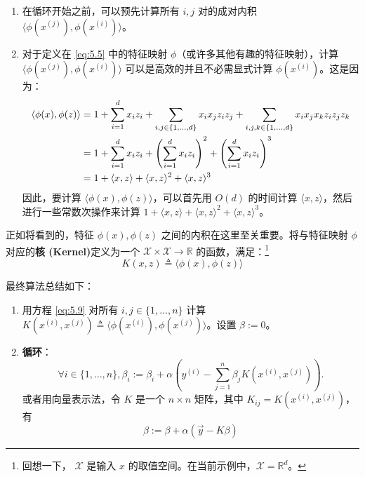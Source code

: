 \begin{enumerate}
    \item 在循环开始之前，可以预先计算所有 $i, j$ 对的成对内积 $\langle \phi(x^{(j)}), \phi(x^{(i)}) \rangle$。
    \item 对于定义在 \eqref{eq:5.5} 中的特征映射 $\phi$（或许多其他有趣的特征映射），计算 $\langle \phi(x^{(j)}), \phi(x^{(i)}) \rangle$ 可以是高效的并且不必需显式计算 $\phi(x^{(i)})$。这是因为：
    \begin{align} 
        \langle \phi(x), \phi(z) \rangle &= 1 + \sum_{i=1}^d x_i z_i + \sum_{i,j \in \{1, \dots, d\}} x_i x_j z_i z_j + \sum_{i,j,k \in \{1, \dots, d\}} x_i x_j x_k z_i z_j z_k \notag\\ 
        &= 1 + \sum_{i=1}^d x_i z_i + \left( \sum_{i=1}^d x_i z_i \right)^2 + \left( \sum_{i=1}^d x_i z_i \right)^3 \notag\\ 
        &= 1 + \langle x, z \rangle + \langle x, z \rangle^2 + \langle x, z \rangle^3 \label{eq:5.9}
    \end{align}
    因此，要计算 $\langle \phi(x), \phi(z) \rangle$，可以首先用 $O(d)$ 的时间计算 $\langle x, z \rangle$，然后进行一些常数次操作来计算 $1 + \langle x, z \rangle + \langle x, z \rangle^2 + \langle x, z \rangle^3$。
\end{enumerate}

正如将看到的，特征 $\phi(x), \phi(z)$ 之间的内积在这里至关重要。将与特征映射 $\phi$ 对应的\textbf{核 (Kernel)}定义为一个 $\mathcal{X} \times \mathcal{X} \to \mathbb{R}$ 的函数，满足：\footnote{回想一下， $\mathcal{X}$ 是输入 $x$ 的取值空间。在当前示例中，$\mathcal{X} = \mathbb{R}^d$。}
\begin{equation}
    K(x, z) \triangleq \langle \phi(x), \phi(z) \rangle
\end{equation}

最终算法总结如下：

\noindent\hrulefill
\begin{enumerate}
    \item 用方程 \eqref{eq:5.9} 对所有 $i, j \in \{1, \dots, n\}$ 计算 $K(x^{(i)}, x^{(j)}) \triangleq \langle \phi(x^{(i)}), \phi(x^{(j)}) \rangle$。设置 $\beta := 0$。
    \item \textbf{循环}：
    \begin{equation}
        \forall i \in \{1, \dots, n\}, \beta_i := \beta_i + \alpha \left( y^{(i)} - \sum_{j=1}^n \beta_j K(x^{(i)}, x^{(j)}) \right).
        \label{eq:kernel_algo}
    \end{equation}
    或者用向量表示法，令 $K$ 是一个 $n \times n$ 矩阵，其中 $K_{ij} = K(x^{(i)}, x^{(j)})$，有
    \[
        \beta := \beta + \alpha (\vec{y} - K \beta)
    \]
\end{enumerate}
\hrulefill

